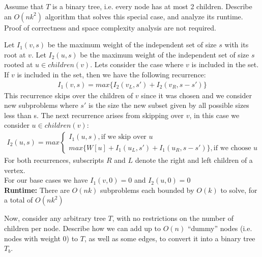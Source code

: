 \documentclass[11pt]{article}
\begin{document}
\begin{subparts}
    \item Assume that $T$ is a binary tree, i.e. every node has at most 2 children.  Describe an $O(nk^2)$ algorithm that solves this special case, and analyze its runtime. Proof of correctness and space complexity analysis are not required.\\
    \begin{solution}
        Let $I_1(v, s)$ be the maximum weight of the independent set of size $s$ with its root at $v$. Let $I_2(u, s)$ be the maximum 
        weight of the independent set of size $s$ rooted at $u \in children(v)$. Lets consider the case
        where $v$ is included in the set. If $v$ is included in the set, then we have the following recurrence:\\
        \begin{align*}
            I_1(v, s) = max\{I_2(v_L, s') + I_2(v_R, s-s')\}
        \end{align*}
        This recurrence skips over the children of $v$ since it was chosen and we consider new subproblems where $s'$ is the size the new subset given by all possible sizes less than s. 
        The next recurrence arises from skipping over $v$, in this case we consider $u \in children(v)$:
        \begin{align*}
            I_2(u, s) = max\begin{cases}
                            I_1(u, s), \text{if we skip over $u$}\\
                            max\{W[u] + I_1(u_L, s') + I_1(u_R, s-s')\}, \text{if we choose $u$}
                        \end{cases}
        \end{align*}
        For both recurrences, subscripts $R$ and $L$ denote the right and left children of a vertex.\\
        For our base cases we have $I_1(v, 0) = 0$ and $I_2(u, 0) = 0$
       \\\textbf{Runtime: }There are $O(nk)$ subproblems each bounded by $O(k)$ to solve, for a total of $O(nk^2)$
    \end{solution}
    \newpage
    \item Now, consider any arbitrary tree $T$, with no restrictions on the number of children per node. Describe how we can add up to $O(n)$ ``dummy'' nodes (i.e. nodes with weight 0) to $T$, as well as some edges, to convert it into a binary tree $T_b$. \\
    \begin{solution}

\end{solution}
\end{subparts}
\end{document}
